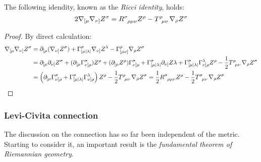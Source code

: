 \begin{theorem}
  The following idendity, known as the \textit{Ricci identity}, holds:
  \begin{equation}
    2 \na_{[\mu} \na_{\nu]} Z^\sigma = \tensor{R}{^\sigma _\rho _\mu _\nu} Z^\rho - \tensor{T}{^\rho_{\mu \nu}} \na_\rho Z^\sigma
    \label{eq:3.38}
  \end{equation}
\end{theorem}
\begin{proof}
  By direct calculation:
  \begin{equation*}
    \begin{split}
      \na_{[\mu} \na_{\nu]} Z^\sigma
      &= \pa_{[\mu} (\na_{\nu]} Z^\sigma) + \Gamma^\sigma_{[\mu | \lambda |} \na_{\nu]} Z^\lambda - \Gamma^\rho_{[\mu \nu]} \na_\rho Z^\sigma \\
      &= \pa_{[\mu} \pa_{\nu]} Z^\sigma + (\pa_{[\mu} \Gamma^\sigma_{\nu]\rho}) Z^\rho + (\pa_{[\mu} Z^\rho) \Gamma^\sigma_{\nu]\rho} + \Gamma^\sigma_{[\mu | \lambda |} \pa_{\nu]} Z\lambda + \Gamma^\sigma_{[\mu | \lambda |} \Gamma^\lambda_{\nu] \rho} Z^\rho - \frac{1}{2} \tensor{T}{^\rho_{\mu \nu}} \na_\rho Z^\sigma \\
      &= \left( \pa_{[\mu} \Gamma^\sigma_{\nu]\rho} + \Gamma^\sigma_{[\mu | \lambda |} \Gamma^\lambda_{\nu]\rho} \right) Z^\rho - \frac{1}{2} \tensor{T}{^\rho_{\mu \nu}} \na_\rho Z^\sigma = \frac{1}{2} \tensor{R}{^\sigma_{\rho \mu \nu}} Z^\rho - \frac{1}{2} \tensor{T}{^\sigma_{\mu \nu}} \na_\rho Z^\sigma
    \end{split}
  \end{equation*}
\end{proof}

\subsubsection{Levi-Civita connection}

The discussion on the connection has so far been independent of the metric. Starting to consider it, an important result is the \textit{fundamental theorem of Riemannian geometry}.

